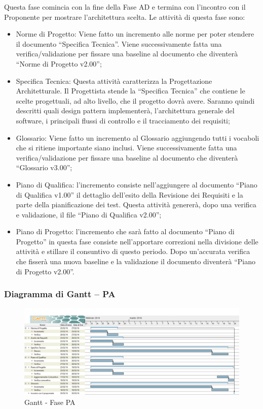 \documentclass[../PianoProgetto.tex]{subfiles}
\begin{document}
		Questa fase comincia con la fine della Fase AD e termina con l’incontro con il Proponente per mostrare l’architettura scelta. Le attività di questa fase sono:
		\begin{itemize}
			\item Norme di Progetto: Viene fatto un incremento alle norme per poter stendere il documento “Specifica Tecnica”. Viene successivamente fatta una verifica/validazione per fissare una baseline al documento che diventerà “Norme di Progetto v2.00”;

			\item Specifica Tecnica: Questa attività caratterizza la Progettazione Architetturale. Il Progettista stende la “Specifica Tecnica” che contiene le scelte progettuali, ad alto livello, che il progetto dovrà avere. Saranno quindi descritti quali design pattern implementerà, l’architettura generale del software, i principali flussi di controllo e il tracciamento dei requisiti;

			\item Glossario: Viene fatto un incremento al Glossario aggiungendo tutti i vocaboli che si ritiene importante siano inclusi. Viene successivamente fatta una verifica/validazione per fissare una baseline al documento che diventerà “Glossario v3.00”;

 			\item Piano di Qualifica: l’incremento consiste nell’aggiungere al documento “Piano di Qualifica v1.00” il dettaglio dell’esito della Revisione dei Requisiti e la parte della pianificazione dei test. Questa attività genererà, dopo una verifica e validazione, il file “Piano di Qualifica v2.00”;

			\item Piano di Progetto: l’incremento che sarà fatto al documento “Piano di Progetto” in questa fase consiste nell’apportare correzioni nella divisione delle attività e stillare il consuntivo di questo periodo. Dopo un’accurata verifica che fisserà una nuova baseline e la validazione il documento diventerà “Piano di Progetto v2.00”.
		\end{itemize}
		
		\subsubsection{Diagramma di Gantt – PA}
			\begin{figure}[!h]
				\centering
				\includegraphics[width=\textwidth]{gantt_png/3-progettazione_architetturale}
				\caption{Gantt - Fase PA}
				\label{fig:Gantt - Fase PA}
			\end{figure}
						
\end{document}
